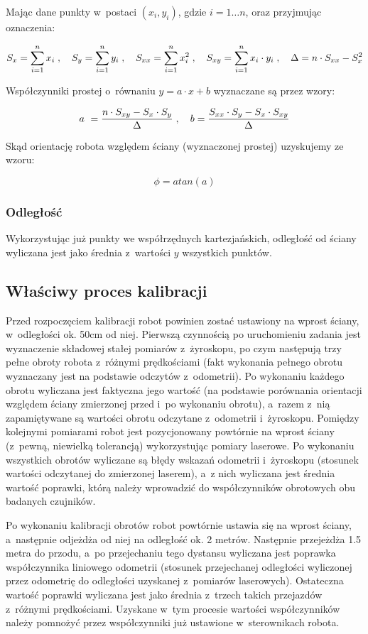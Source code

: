 Mając dane punkty w~postaci $(x_i, y_i)$, gdzie $i=1\ldots n$, oraz przyjmując
oznaczenia:

\[
S_x = \sum_{i=1}^n x_i \; , \quad
S_y = \sum_{i=1}^n y_i \; , \quad
S_{xx} = \sum_{i=1}^n x_i^2 \; , \quad
S_{xy} = \sum_{i=1}^n x_i \cdot y_i \; , \quad
\Delta = n \cdot S_{xx} - S_x^2
\]

Współczynniki prostej o~równaniu $y=a\cdot x+b$ wyznaczane są przez wzory:

\[
a~= \frac{n \cdot S_{xy} - S_x \cdot S_y}{\Delta} \; , \quad
b = \frac{S_{xx} \cdot S_y - S_x \cdot S_{xy}}{\Delta}
\]

Skąd orientację robota względem ściany (wyznaczonej prostej) uzyskujemy ze
wzoru:

\[
\phi=atan(a)
\]

\subsubsection{Odległość}

Wykorzystując już punkty we współrzędnych kartezjańskich, odległość od ściany
wyliczana jest jako średnia z~wartości $y$ wszystkich punktów.

\subsection{Właściwy proces kalibracji}

Przed rozpoczęciem kalibracji robot powinien zostać ustawiony na wprost ściany,
w~odległości ok. 50cm od niej. Pierwszą czynnością po uruchomieniu zadania jest
wyznaczenie składowej stałej pomiarów z~żyroskopu, po czym następują trzy
pełne obroty robota z~różnymi prędkościami (fakt wykonania pełnego obrotu
wyznaczany jest na podstawie odczytów z~odometrii). Po wykonaniu każdego obrotu
wyliczana jest faktyczna jego wartość (na podstawie porównania orientacji
względem ściany zmierzonej przed i~po wykonaniu obrotu), a~razem z~nią
zapamiętywane są wartości obrotu odczytane z~odometrii i~żyroskopu. Pomiędzy
kolejnymi pomiarami robot jest pozycjonowany powtórnie na wprost ściany
(z~pewną, niewielką tolerancją) wykorzystując pomiary laserowe. Po wykonaniu
wszystkich obrotów wyliczane są błędy wskazań odometrii i~żyroskopu (stosunek
wartości odczytanej do zmierzonej laserem), a~z nich wyliczana jest średnia
wartość poprawki, którą należy wprowadzić do współczynników obrotowych obu
badanych czujników.

Po wykonaniu kalibracji obrotów robot powtórnie ustawia się na wprost ściany,
a~następnie odjeżdża od niej na odległość ok. 2 metrów. Następnie przejeżdża 1.5
metra do przodu, a~po przejechaniu tego dystansu wyliczana jest poprawka
współczynnika liniowego odometrii (stosunek przejechanej odległości wyliczonej
przez odometrię do odległości uzyskanej z~pomiarów laserowych). Ostateczna
wartość poprawki wyliczana jest jako średnia z~trzech takich przejazdów
z~różnymi prędkościami. Uzyskane w~tym procesie wartości współczynników należy
pomnożyć przez współczynniki już ustawione w~sterownikach robota.



